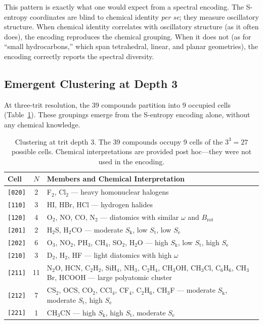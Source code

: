 \documentclass[11pt,twocolumn,a4paper]{article}
\theoremstyle{definition}
\theoremstyle{remark}
\newcommand{\Sk}{S_{\mathrm{k}}}
\newcommand{\St}{S_{\mathrm{t}}}
\newcommand{\Se}{S_{\mathrm{e}}}
\newcommand{\Brot}{B_{\mathrm{rot}}}
\begin{document}
This pattern is exactly what one would expect from a spectral encoding. The S-entropy coordinates are blind to chemical identity \emph{per se}; they measure oscillatory structure. When chemical identity correlates with oscillatory structure (as it often does), the encoding reproduces the chemical grouping. When it does not (as for ``small hydrocarbons,'' which span tetrahedral, linear, and planar geometries), the encoding correctly reports the spectral diversity.

\subsection{Emergent Clustering at Depth 3}

At three-trit resolution, the 39 compounds partition into 9 occupied cells (Table~\ref{tab:depth3}). These groupings emerge from the S-entropy encoding alone, without any chemical knowledge.

\begin{table}[H]
\centering
\caption{Clustering at trit depth 3. The 39 compounds occupy 9 cells of the $3^3 = 27$ possible cells. Chemical interpretations are provided post hoc---they were not used in the encoding.}
\label{tab:depth3}
\begin{tabular}{lcp{8.5cm}}
\toprule
Cell & $N$ & Members and Chemical Interpretation \\
\midrule
\texttt{[020]} & 2 & F$_2$, Cl$_2$ --- heavy homonuclear halogens \\
\texttt{[110]} & 3 & HI, HBr, HCl --- hydrogen halides \\
\texttt{[120]} & 4 & O$_2$, NO, CO, N$_2$ --- diatomics with similar $\omega$ and $\Brot$ \\
\texttt{[201]} & 2 & H$_2$S, H$_2$CO --- moderate $\Sk$, low $\St$, low $\Se$ \\
\texttt{[202]} & 6 & O$_3$, NO$_2$, PH$_3$, CH$_4$, SO$_2$, H$_2$O --- high $\Sk$, low $\St$, high $\Se$ \\
\texttt{[210]} & 3 & D$_2$, H$_2$, HF --- light diatomics with high $\omega$ \\
\texttt{[211]} & 11 & N$_2$O, HCN, C$_2$H$_2$, SiH$_4$, NH$_3$, C$_2$H$_4$, CH$_3$OH, CH$_3$Cl, C$_6$H$_6$, CH$_3$Br, HCOOH --- large polyatomic cluster \\
\texttt{[212]} & 7 & CS$_2$, OCS, CO$_2$, CCl$_4$, CF$_4$, C$_2$H$_6$, CH$_3$F --- moderate $\Sk$, moderate $\St$, high $\Se$ \\
\texttt{[221]} & 1 & CH$_3$CN --- high $\Sk$, high $\St$, moderate $\Se$ \\
\bottomrule
\end{tabular}
\end{table}
\end{document}
